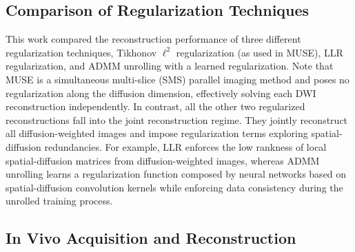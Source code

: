 \documentclass[AMA,STIX2COL,Linenumberson]{MRM}
\begin{document}
\subsection{Comparison of Regularization Techniques}

This work compared the reconstruction performance
of three different regularization techniques,
Tikhonov $\ell^2$ regularization (as used in MUSE),
LLR regularization,
and ADMM unrolling with a learned regularization.
Note that MUSE is a simultaneous multi-slice (SMS) parallel imaging method
and poses no regularization along the diffusion dimension,
effectively solving each DWI reconstruction independently.
In contrast, all the other two regularized reconstructions
fall into the joint reconstruction regime.
They jointly reconstruct all diffusion-weighted images
and impose regularization terms exploring spatial-diffusion redundancies.
For example, LLR enforces the low rankness of
local spatial-diffusion matrices from diffusion-weighted images,
whereas ADMM unrolling learns a regularization function composed by neural networks
based on spatial-diffusion convolution kernels
while enforcing data consistency during the unrolled training process.

\subsection{In Vivo Acquisition and Reconstruction}
\end{document}
